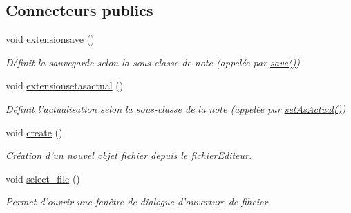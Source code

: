 \subsection*{Connecteurs publics}
\begin{DoxyCompactItemize}
\item 
\hypertarget{class_fichier_editeur_a1ab7b70f3f0cad780738c7307153a6da}{void \hyperlink{class_fichier_editeur_a1ab7b70f3f0cad780738c7307153a6da}{extensionsave} ()}\label{class_fichier_editeur_a1ab7b70f3f0cad780738c7307153a6da}

\begin{DoxyCompactList}\small\item\em Définit la sauvegarde selon la sous-\/classe de note (appelée par \hyperlink{class_note_editeur_a605b1bca885c25460cb7d8863d1f3d03}{save()}) \end{DoxyCompactList}\item 
\hypertarget{class_fichier_editeur_aff752c846d91e0b368b2fa6c90ad7bd0}{void \hyperlink{class_fichier_editeur_aff752c846d91e0b368b2fa6c90ad7bd0}{extensionsetasactual} ()}\label{class_fichier_editeur_aff752c846d91e0b368b2fa6c90ad7bd0}

\begin{DoxyCompactList}\small\item\em Définit l'actualisation selon la sous-\/classe de la note (appelée par \hyperlink{class_note_editeur_a857f285628a0b7dcb6a69b18c977aa71}{set\-As\-Actual()}) \end{DoxyCompactList}\item 
\hypertarget{class_fichier_editeur_adba804d5e299736d749696e0f7d554a9}{void \hyperlink{class_fichier_editeur_adba804d5e299736d749696e0f7d554a9}{create} ()}\label{class_fichier_editeur_adba804d5e299736d749696e0f7d554a9}

\begin{DoxyCompactList}\small\item\em Création d'un nouvel objet fichier depuis le fichier\-Editeur. \end{DoxyCompactList}\item 
void \hyperlink{class_fichier_editeur_a1cab6a95ce1ba94430b990cf5b5151ff}{select\-\_\-file} ()
\begin{DoxyCompactList}\small\item\em Permet d'ouvrir une fenêtre de dialogue d'ouverture de fihcier. \end{DoxyCompactList}\end{DoxyCompactItemize}
